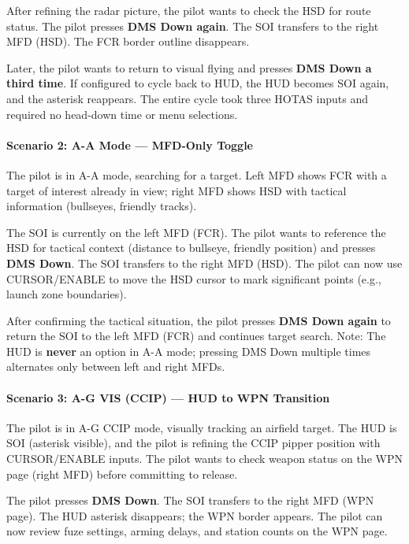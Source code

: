 \documentclass[11pt,a4paper]{article}
\begin{document}
After refining the radar picture, the pilot wants to check the HSD for route status. The pilot presses \textbf{DMS Down again}. The SOI transfers to the right MFD (HSD). The FCR border outline disappears.

Later, the pilot wants to return to visual flying and presses \textbf{DMS Down a third time}. If configured to cycle back to HUD, the HUD becomes SOI again, and the asterisk reappears. The entire cycle took three HOTAS inputs and required no head-down time or menu selections.

\paragraph*{Scenario 2: A-A Mode --- MFD-Only Toggle}

The pilot is in A-A mode, searching for a target. Left MFD shows FCR with a target of interest already in view; right MFD shows HSD with tactical information (bullseyes, friendly tracks).

The SOI is currently on the left MFD (FCR). The pilot wants to reference the HSD for tactical context (distance to bullseye, friendly position) and presses \textbf{DMS Down}. The SOI transfers to the right MFD (HSD). The pilot can now use CURSOR/ENABLE to move the HSD cursor to mark significant points (e.g., launch zone boundaries).

After confirming the tactical situation, the pilot presses \textbf{DMS Down again} to return the SOI to the left MFD (FCR) and continues target search. Note: The HUD is \textbf{never} an option in A-A mode; pressing DMS Down multiple times alternates only between left and right MFDs.

\paragraph*{Scenario 3: A-G VIS (CCIP) --- HUD to WPN Transition}

The pilot is in A-G CCIP mode, visually tracking an airfield target. The HUD is SOI (asterisk visible), and the pilot is refining the CCIP pipper position with CURSOR/ENABLE inputs. The pilot wants to check weapon status on the WPN page (right MFD) before committing to release.

The pilot presses \textbf{DMS Down}. The SOI transfers to the right MFD (WPN page). The HUD asterisk disappears; the WPN border appears. The pilot can now review fuze settings, arming delays, and station counts on the WPN page.
\end{document}
